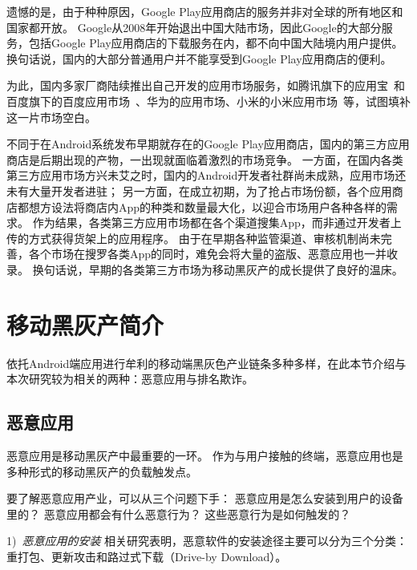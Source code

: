 遗憾的是，由于种种原因，Google Play应用商店的服务并非对全球的所有地区和国家都开放。
Google从2008年开始退出中国大陆市场，因此Google的大部分服务，包括Google Play应用商店的下载服务在内，都不向中国大陆境内用户提供。
换句话说，国内的大部分普通用户并不能享受到Google Play应用商店的便利。

为此，国内多家厂商陆续推出自己开发的应用市场服务，如腾讯旗下的应用宝~\cite{Myapp}和百度旗下的百度应用市场~\cite{Baiduappstore}、华为的应用市场、小米的小米应用市场~\cite{Xiaomiappstore}等，试图填补这一片市场空白。
%

不同于在Android系统发布早期就存在的Google Play应用商店，国内的第三方应用商店是后期出现的产物，一出现就面临着激烈的市场竞争。
一方面，在国内各类第三方应用市场方兴未艾之时，国内的Android开发者社群尚未成熟，应用市场还未有大量开发者进驻；
另一方面，在成立初期，为了抢占市场份额，各个应用商店都想方设法将商店内App的种类和数量最大化，以迎合市场用户各种各样的需求。
作为结果，各类第三方应用市场都在各个渠道搜集App，而非通过开发者上传的方式获得货架上的应用程序。
由于在早期各种监管渠道、审核机制尚未完善，各个市场在搜罗各类App的同时，难免会将大量的盗版、恶意应用也一并收录。
换句话说，早期的各类第三方市场为移动黑灰产的成长提供了良好的温床。

\section{移动黑灰产简介}
依托Android端应用进行牟利的移动端黑灰色产业链条多种多样，在此本节介绍与本次研究较为相关的两种：恶意应用与排名欺诈。

\subsection{恶意应用}
恶意应用是移动黑灰产中最重要的一环。
作为与用户接触的终端，恶意应用也是多种形式的移动黑灰产的负载触发点。

要了解恶意应用产业，可以从三个问题下手：
恶意应用是怎么安装到用户的设备里的？
恶意应用都会有什么恶意行为？
这些恶意行为是如何触发的？

1)\ \emph{恶意应用的安装} \quad
相关研究表明，恶意软件的安装途径主要可以分为三个分类：重打包、更新攻击和路过式下载（Drive-by Download）\cite{Zhou2012DissectingAM}。

